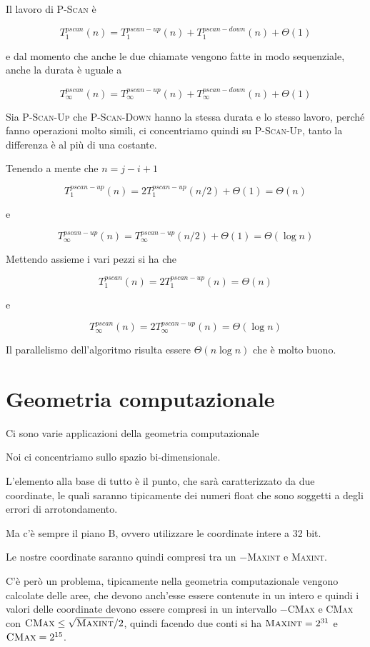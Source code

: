 Il lavoro di \textsc{P-Scan} è

$$
T_{1}^{pscan}(n) = T_{1}^{pscan-up}(n) + T_{1}^{pscan-down}(n) + \Theta(1)
$$

e dal momento che anche le due chiamate vengono fatte in modo
sequenziale, anche la durata è uguale a

$$
T_{\infty}^{pscan}(n) = T_{\infty}^{pscan-up}(n) + T_{\infty}^{pscan-down}(n) + \Theta(1)
$$

Sia \textsc{P-Scan-Up} che \textsc{P-Scan-Down} hanno la stessa durata e lo stesso lavoro, perché fanno operazioni molto simili, ci concentriamo quindi su \textsc{P-Scan-Up}, tanto la differenza è al più di una costante.

Tenendo a mente che $n = j - i +1 $

$$
T_{1}^{pscan-up}(n) = 2 T_{1}^{pscan-up}(n/2) + \Theta(1) = \Theta(n)
$$

e

$$
T_{\infty}^{pscan-up}(n) = T_{\infty}^{pscan-up}(n/2) + \Theta(1) = \Theta(\log n)
$$

Mettendo assieme i vari pezzi si ha che

$$
T_{1}^{pscan}(n) = 2 T_{1}^{pscan-up}(n) = \Theta(n)
$$

e

$$
T_{\infty}^{pscan}(n) = 2T_{\infty}^{pscan-up}(n) = \Theta(\log n)
$$

Il parallelismo dell'algoritmo risulta essere $\Theta(n \log n)$ che è molto buono.


\chapter{Geometria computazionale}

Ci sono varie applicazioni della geometria computazionale

Noi ci concentriamo sullo spazio bi-dimensionale.

L'elemento alla base di tutto è il punto, che sarà caratterizzato da due coordinate, le quali saranno tipicamente dei numeri float che sono soggetti a degli errori di arrotondamento.

Ma c'è sempre il piano B, ovvero utilizzare le coordinate intere a 32 bit.

Le nostre coordinate saranno quindi compresi tra un $-$\textsc{Maxint} e \textsc{Maxint}.

C'è però un problema, tipicamente nella geometria computazionale vengono calcolate delle aree, che devono anch'esse essere contenute in un intero e quindi i valori delle coordinate devono essere compresi in un intervallo $-$\textsc{CMax} e \textsc{CMax} con $\textsc{CMax} \leq \sqrt{\textsc{Maxint}} /2$, quindi facendo due conti si ha $\textsc{Maxint} = 2^{31} $ e $\textsc{CMax} = 2^{15}$.

